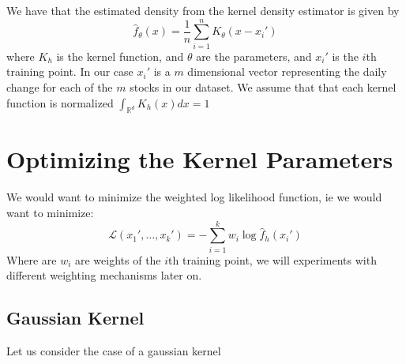 \documentclass[12pt]{article}
\author{Lawrence Liu}
\begin{document}
We have that the estimated density from the kernel density estimator is given by
\begin{equation}
\hat{f}_{\theta}(x) = \frac{1}{n} \sum_{i=1}^n K_{\theta}(x-x_i')
\end{equation}
where $K_h$ is the kernel function, and $\theta$ are the parameters, and $x_i'$ is the $i$th training point. 
In our case $x_i'$ is a $m$ dimensional vector representing the daily change for each of the $m$ stocks in our dataset.
We assume that that each kernel function is normalized $\int_{\mathbb{R}^d} K_h(x) dx = 1$
\section*{Optimizing the Kernel Parameters}
We would want to minimize the weighted log likelihood function, ie we would want to minimize:
\begin{equation}
    \mathcal{L}(x_1',\dots,x_k') = -\sum_{i=1}^k w_i\log \hat{f}_h(x_i')
\end{equation}
Where are $w_i$ are weights of the $i$th training point, we will experiments with different weighting mechanisms later on.
\subsection*{Gaussian Kernel}
Let us consider the case of a gaussian kernel 
\end{document}
